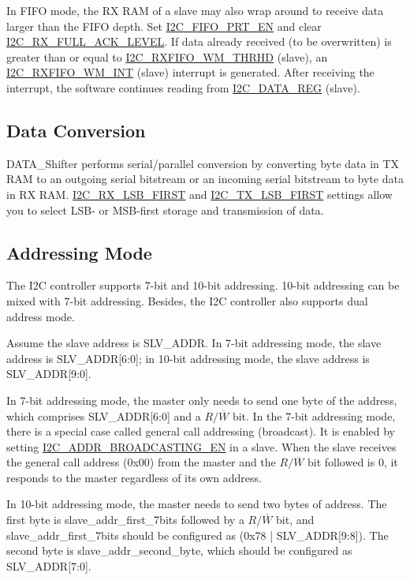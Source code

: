 \documentclass[main\_\_EN.tex]{subfiles}
\begin{document}
In FIFO mode, the RX RAM of a slave may also wrap around to receive data larger than the FIFO depth. Set \hyperref[fielddesc:I2CFIFOPRTEN]{I2C\_FIFO\_PRT\_EN} and clear \hyperref[fielddesc:I2CRXFULLACKLEVEL]{I2C\_RX\_FULL\_ACK\_LEVEL}. If data already received (to be overwritten) is greater than or equal to \hyperref[fielddesc:I2CRXFIFOWMTHRHD]{I2C\_RXFIFO\_WM\_THRHD} (slave), an \hyperref[int:i2c-rxfifo-wm]{I2C\_RXFIFO\_WM\_INT} (slave) interrupt is generated. After receiving the interrupt, the software continues reading from \hyperref[regdesc:I2CDATAREG]{I2C\_DATA\_REG} (slave).

\subsection{Data Conversion}
DATA\_Shifter performs serial/parallel conversion by converting byte data in TX RAM to an outgoing serial bitstream or an incoming serial bitstream to byte data in RX RAM. \hyperref[fielddesc:I2CRXLSBFIRST]{I2C\_RX\_LSB\_FIRST} and \hyperref[fielddesc:I2CTXLSBFIRST]{I2C\_TX\_LSB\_FIRST} settings allow you to select LSB- or MSB-first storage and transmission of data.

\subsection{Addressing Mode}
The \chipname{} I2C controller supports 7-bit and 10-bit addressing. 10-bit addressing can be mixed with 7-bit addressing. Besides, the \chipname{} I2C controller also supports dual address mode.

Assume the slave address is SLV\_ADDR. In 7-bit addressing mode, the slave address is SLV\_ADDR[6:0]; in 10-bit addressing mode, the slave address is SLV\_ADDR[9:0].

In 7-bit addressing mode, the master only needs to send one byte of the address, which comprises SLV\_ADDR[6:0] and a $R/\overline W$ bit. In the 7-bit addressing mode, there is a special case called general call addressing (broadcast). It is enabled by setting \hyperref[fielddesc:I2CADDRBROADCASTINGEN]{I2C\_ADDR\_BROADCASTING\_EN} in a slave. When the slave receives the general call address (0x00) from the master and the $R/\overline W$ bit followed is 0, it responds to the master regardless of its own address.

In 10-bit addressing mode, the master needs to send two bytes of address. The first byte is slave\_addr\_first\_7bits followed by a $R/\overline W$ bit, and slave\_addr\_first\_7bits should be configured as (0x78 | SLV\_ADDR[9:8]). The second byte is slave\_addr\_second\_byte, which should be configured as SLV\_ADDR[7:0]. 
\end{document}
